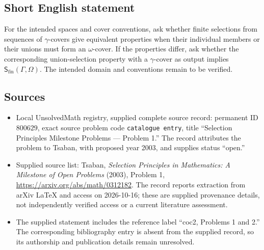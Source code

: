 \documentclass[11pt]{article}
\begin{document}
\subsection{Short English statement}
For the intended spaces and cover conventions, ask whether finite selections from sequences of \(\gamma\)-covers give equivalent properties when their individual members or their unions must form an \(\omega\)-cover. If the properties differ, ask whether the corresponding union-selection property with a \(\gamma\)-cover as output implies \(\mathsf S_{\mathrm{fin}}(\Gamma,\Omega)\). The intended domain and conventions remain to be verified.
\subsection{Sources}
\begin{itemize}
\item Local UnsolvedMath registry, supplied complete source record: permanent ID \(800629\), exact source problem code \texttt{catalogue entry}, title ``Selection Principles Milestone Problems --- Problem 1.'' The record attributes the problem to Tsaban, with proposed year 2003, and supplies status ``open.''
\item Supplied source list: Tsaban, \emph{Selection Principles in Mathematics: A Milestone of Open Problems} (2003), Problem 1, \url{https://arxiv.org/abs/math/0312182}. The record reports extraction from arXiv LaTeX and access on 2026-10-16; these are supplied provenance details, not independently verified access or a current literature assessment.
\item The supplied statement includes the reference label ``coc2, Problems 1 and 2.'' The corresponding bibliography entry is absent from the supplied record, so its authorship and publication details remain unresolved.
\end{itemize}
\end{document}
